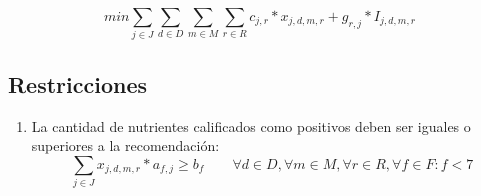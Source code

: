 \documentclass[letterpaper]{article}
\begin{document}
    
    \begin{equation*}
    min \sum_{j \in J}\sum_{d \in D}\sum_{m \in M}\sum_{r \in R}{c_{j,r} * x_{j,d,m,r} + g_{r,j} * I_{j,d,m,r} }
    \end{equation*}

    \subsection{Restricciones}
    \begin{enumerate}
    \item La cantidad de nutrientes calificados como positivos deben ser iguales o superiores a la recomendación:
        \begin{equation*}
            \sum_{j \in J} x_{j,d,m,r}* a_{f,j}  \geq b_{f} \qquad \forall d \in D, \forall m \in M, \forall r \in R, \forall f \in F : f < 7
        \end{equation*}
    

\end{enumerate}
\end{document}
